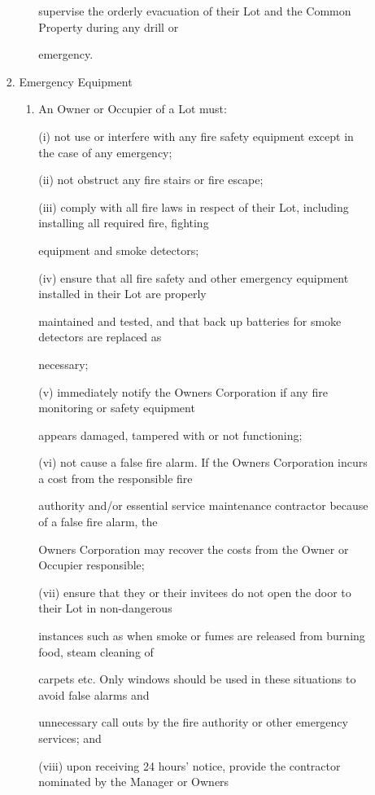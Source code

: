 \documentclass{article}
\begin{document}
\begin{enumerate}[label=\arabic*.]
\begin{enumerate}[label=\arabic{enumi}.\arabic*.]
\begin{enumerate}[label=(\arabic*)]
\begin{enumerate}[label=(\alph*)]
supervise the orderly evacuation of their Lot and the Common Property during any drill or 

emergency. 

\end{enumerate}
\item  Emergency Equipment 

\begin{enumerate}[label=(\alph*)]
\item  An Owner or Occupier of a Lot must: 

(i) not use or interfere with any fire safety equipment except in the case of any emergency; 

(ii) not obstruct any fire stairs or fire escape; 

(iii) comply with all fire laws in respect of their Lot, including installing all required fire, fighting 

equipment and smoke detectors; 

\newpage

(iv) ensure that all fire safety and other emergency equipment installed in their Lot are properly 

maintained and tested, and that back up batteries for smoke detectors are replaced as 

necessary; 

(v) immediately notify the Owners Corporation if any fire monitoring or safety equipment 

appears damaged, tampered with or not functioning; 

(vi) not cause a false fire alarm. If the Owners Corporation incurs a cost from the responsible fire 

authority and/or essential service maintenance contractor because of a false fire alarm, the 

Owners Corporation may recover the costs from the Owner or Occupier responsible; 

(vii) ensure that they or their invitees do not open the door to their Lot in non-dangerous 

instances such as when smoke or fumes are released from burning food, steam cleaning of 

carpets etc. Only windows should be used in these situations to avoid false alarms and 

unnecessary call outs by the fire authority or other emergency services; and 

(viii) upon receiving 24 hours’ notice, provide the contractor nominated by the Manager or Owners 


\end{enumerate}
\end{enumerate}
\end{enumerate}
\end{enumerate}
\end{document}
